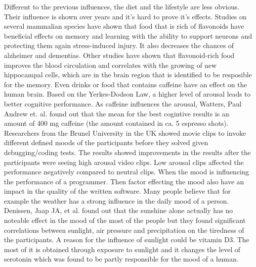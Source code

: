 Different to the previous influences, the diet and the lifestyle are less obvious. Their influence is shown over years and it's hard to prove it's effects.
Studies on several mammalian species have shown that food that is rich of flavonoids have beneficial effects on memory and learning with the ability to support neurons and protecting them again stress-induced injury.
It also decreases the chances of alzheimer and dementias. Other studies have shown that flavonoid-rich food improves the blood circulation and correlates with the growing of new hippocampal cells, which are in the brain region that is identified to be resposible for the memory.
Even drinks or food that contains caffeine have an effect on the human brain.
Based on the Yerkes-Dodson Law, a higher level of arousal leads to better cognitive performance. As caffeine influences the arousal, Watters, Paul Andrew et. al. \cite{watters1997caffeine} found out that the mean for the best cogintive results is an amount of 400 mg caffeine (the amount contained in ca. 5 espresso shots).
Researchers from the Brunel University in the UK showed movie clips to invoke different defined moods of the participants before they solved given debugging/coding tests. The results showed improvements in the results after the participants were seeing high arousal video clips. Low arousal clips affected the performance negatively compared to neutral clips. \cite{khan2007mood}
When the mood is influencing the performance of a programmer. Then factor effecting the mood also have an impact in the quality of the written software. Many people believe that for example the weather has a strong influence in the daily mood of a person. Denissen, Jaap JA, et al. \cite{denissen2008effects} found out that the sunshine alone actually has no noteable effect in the mood of the most of the people but they found significant correlations between sunlight, air pressure and precipitation on the tiredness of the participants.
A reason for the influence of sunlight could be vitamin D3. The most of it is obtained through exposure to sunlight and it changes the level of serotonin which was found to be partly responsible for the mood of a human.
